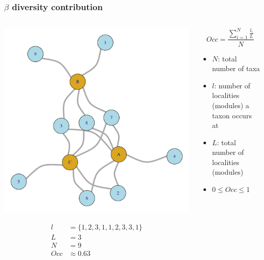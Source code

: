\documentclass{beamer}
\begin{document}
\begin{frame}
  \frametitle{\(\beta\) diversity contribution}

  \begin{columns}
    \begin{column}{0.6\textwidth}
      \begin{center}
        \includegraphics[height = 0.5\textheight, width = \textwidth, keepaspectratio = true]{figure/sim_graph}

        \begin{align*}
          l &= \{1, 2, 3, 1, 1, 2, 3, 3, 1\}\\
          L &= 3\\
          N &= 9\\
          Occ &\approx 0.63 
        \end{align*}
      \end{center}
    \end{column}
    \begin{column}{0.4\textwidth}
      \[
        Occ = \frac{\sum_{i = 1}^{N} \frac{l_{i}}{L}}{N}
      \]

      \begin{itemize}
        \item \(N\): total number of taxa
        \item \(l\): number of localities (modules) a taxon occurs at
        \item \(L\): total number of localities (modules)
        \item \(0 \leq Occ \leq 1\)
      \end{itemize}
    \end{column}
  \end{columns}
\end{frame}
\end{document}
